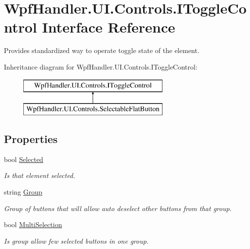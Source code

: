 \hypertarget{interface_wpf_handler_1_1_u_i_1_1_controls_1_1_i_toggle_control}{}\section{Wpf\+Handler.\+U\+I.\+Controls.\+I\+Toggle\+Control Interface Reference}
\label{interface_wpf_handler_1_1_u_i_1_1_controls_1_1_i_toggle_control}


Provides standardized way to operate toggle state of the element.  


Inheritance diagram for Wpf\+Handler.\+U\+I.\+Controls.\+I\+Toggle\+Control\+:\begin{figure}[H]
\begin{center}
\leavevmode
\includegraphics[height=2.000000cm]{d5/db4/interface_wpf_handler_1_1_u_i_1_1_controls_1_1_i_toggle_control}
\end{center}
\end{figure}
\subsection*{Properties}
\begin{DoxyCompactItemize}
\item 
bool \mbox{\hyperlink{interface_wpf_handler_1_1_u_i_1_1_controls_1_1_i_toggle_control_a7262e3301c8625f3104105ed336bc427}{Selected}}
\begin{DoxyCompactList}\small\item\em Is that element selected. \end{DoxyCompactList}\item 
string \mbox{\hyperlink{interface_wpf_handler_1_1_u_i_1_1_controls_1_1_i_toggle_control_a3ad83163a8f21262b4d48d831ad72541}{Group}}
\begin{DoxyCompactList}\small\item\em Group of buttons that will allow auto deselect other buttons from that group. \end{DoxyCompactList}\item 
bool \mbox{\hyperlink{interface_wpf_handler_1_1_u_i_1_1_controls_1_1_i_toggle_control_a459178217d5156bb32ac1fd9eef9fd20}{Multi\+Selection}}
\begin{DoxyCompactList}\small\item\em Is group allow few selected buttons in one group. \end{DoxyCompactList}\end{DoxyCompactItemize}


